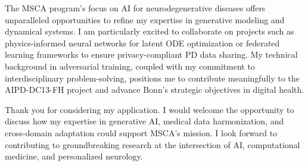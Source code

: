 \documentclass[11pt,a4paper, final]{moderncv}
\begin{document}
The MSCA program's focus on AI for neurodegenerative diseases offers unparalleled opportunities to refine my expertise in generative modeling and dynamical systems. 
I am particularly excited to collaborate on projects such as physics-informed neural networks for latent ODE optimization or federated learning frameworks to ensure privacy-compliant PD data sharing. 
My technical background in adversarial training, coupled with my commitment to interdisciplinary problem-solving, positions me to contribute meaningfully to the AIPD-DC13-FH project and advance Bonn's strategic objectives in digital health.

Thank you for considering my application. 
I would welcome the opportunity to discuss how my expertise in generative AI, medical data harmonization, and cross-domain adaptation could support MSCA's mission. 
I look forward to contributing to groundbreaking research at the intersection of AI, computational medicine, and personalized neurology.

\makeletterclosing
\end{document}
